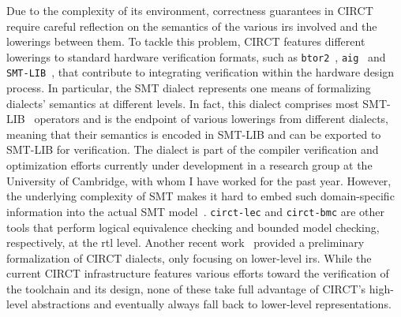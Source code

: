 \documentclass[sigconf,authorversion,nonacm, 11pt]{acmart}
\begin{document}
Due to the complexity of its environment, correctness guarantees in CIRCT require careful reflection on the semantics of the various \acp{ir} involved and the lowerings between them. 
To tackle this problem, CIRCT features different lowerings to standard hardware verification formats, such as \texttt{btor2}~\cite{btor2, niemetz2018btor2}, \texttt{aig}~\cite{aiger2} and \texttt{SMT-LIB}~\cite{barrett2010smt}, 
that contribute to integrating verification within the hardware design process.
In particular, the SMT dialect represents one means of formalizing dialects' semantics at different levels. 
In fact, this dialect comprises most SMT-LIB~\cite{barrett2010smt} operators and is the endpoint of various lowerings from different dialects, %
meaning that their semantics is encoded in SMT-LIB and can be exported to SMT-LIB for verification.
The dialect is part of the compiler verification and optimization efforts currently under development in a research group at the 
University of Cambridge, with whom I have worked for the past year. 
However, the underlying complexity of SMT makes it hard to embed such domain-specific information into the actual SMT model~\cite{gurfinkel2022program}.
\texttt{circt-lec} and \texttt{circt-bmc} are other tools that perform logical equivalence checking and bounded model checking, respectively, at the \ac{rtl} level. 
Another recent work~\cite{zhao2024k} provided a preliminary formalization of CIRCT dialects, only focusing on lower-level \acp{ir}. 
While the current CIRCT infrastructure features various efforts toward the verification of the toolchain and its design, none of these 
take full advantage of CIRCT's high-level abstractions and eventually always fall back to lower-level representations.  
\end{document}
